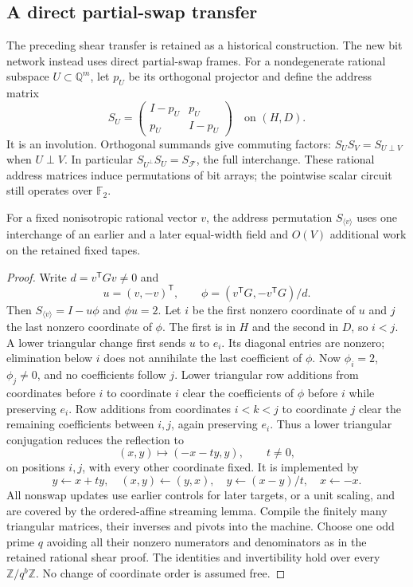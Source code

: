 \subsection{A direct partial-swap transfer}
\label{sec:direct-swap-transfer}
The preceding shear transfer is retained as a historical construction. The
new bit network instead uses direct partial-swap frames. For a nondegenerate
rational subspace $U\subset\mathbb Q^m$, let $p_U$ be its orthogonal
projector and define the address matrix
\[
 S_U=\begin{pmatrix}I-p_U&p_U\\p_U&I-p_U\end{pmatrix}
 \quad\text{on }(H,D).
\]
It is an involution. Orthogonal summands give commuting factors:
$S_US_V=S_{U\perp V}$ when $U\perp V$. In particular
$S_{U^\perp}S_U=S_{\mathcal F}$, the full interchange.
These rational address matrices induce permutations of bit arrays; the
pointwise scalar circuit still operates over $\mathbb F_2$.

\begin{lemma}
\label{lem:direct-swap-line}
For a fixed nonisotropic rational vector $v$, the address permutation
$S_{\langle v\rangle}$ uses one interchange of an earlier and a later
equal-width field and $O(V)$ additional work on the retained fixed tapes.
\end{lemma}
\begin{proof}
Write $d=v^{\mathsf T}Gv\ne0$ and
\[
 u=(v,-v)^{\mathsf T},\qquad
 \phi=(v^{\mathsf T}G,-v^{\mathsf T}G)/d.
\]
Then $S_{\langle v\rangle}=I-u\phi$ and $\phi u=2$.
Let $i$ be the first nonzero coordinate of $u$ and $j$ the last nonzero
coordinate of $\phi$. The first is in $H$ and the second in $D$, so $i<j$.
A lower triangular change first sends $u$ to $e_i$. Its diagonal entries
are nonzero; elimination below $i$ does not annihilate the last coefficient
of $\phi$. Now $\phi_i=2$, $\phi_j\ne0$, and no coefficients follow $j$.
Lower triangular row additions from coordinates before $i$ to coordinate
$i$ clear the coefficients of $\phi$ before $i$ while preserving $e_i$.
Row additions from coordinates $i<k<j$ to coordinate $j$ clear the remaining
coefficients between $i,j$, again preserving $e_i$. Thus a lower triangular
conjugation reduces the reflection to
\[
 (x,y)\longmapsto(-x-ty,y),\qquad t\ne0,
\]
on positions $i,j$, with every other coordinate fixed. It is implemented by
\[
 y\gets x+ty,\quad (x,y)\gets(y,x),\quad
 y\gets(x-y)/t,\quad x\gets-x.
\]
All nonswap updates use earlier controls for later targets, or a unit
scaling, and are covered by the ordered-affine streaming lemma.
Compile the finitely many triangular matrices, their inverses and pivots
into the machine. Choose one odd prime $q$ avoiding all their nonzero
numerators and denominators as in the retained rational shear proof.
The identities and invertibility hold over every $\mathbb Z/q^b\mathbb Z$.
No change of coordinate order is assumed free.
\end{proof}

